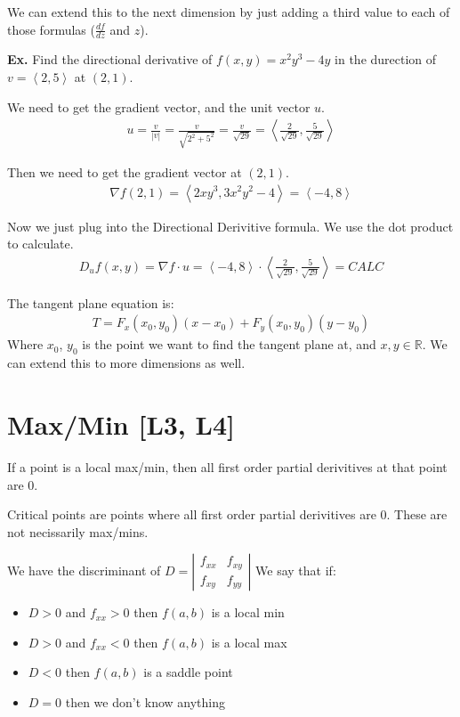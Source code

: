 \documentclass[12pt,letterpaper]{article} \usepackage{amsmath} \usepackage{graphicx} \usepackage[margin=1in]{geometry} \usepackage{longtable}  \usepackage{amssymb}
\begin{document}
	We can extend this to the next dimension by just adding a third value to each of those formulas ($\frac{df}{dz}$ and $z$).
	
	\begin{mdframed}[]
		\textbf{Ex. } Find the directional derivative of $f(x,y) = x^2y^3 - 4y$ in the durection of $v=\left<2,5\right>$ at $(2,1)$.
		
		We need to get the gradient vector, and the unit vector $u$. 
		\begin{align*}
			u = \frac{v}{|v|}=\frac{v}{\sqrt{2^2+5^2}}=\frac{v}{\sqrt{29}}=\left<\frac{2}{\sqrt{29}},\frac{5}{\sqrt{29}}\right>
		\end{align*}
	
		Then we need to get the gradient vector at $(2,1)$.
		\begin{align*}
			\nabla f(2,1)=\left<2xy^3,3x^2y^2-4\right> = \left<-4,8\right>
		\end{align*}
	
		Now we just plug into the Directional Derivitive formula. We use the dot product to calculate.
		\begin{align*}
			D_u f(x,y) = \nabla f \cdot u = \left<-4,8\right> \cdot \left<\frac{2}{\sqrt{29}},\frac{5}{\sqrt{29}}\right> = CALC
		\end{align*}
	\end{mdframed}

	The tangent plane equation is:
	\begin{align*}
		T= F_x (x_0, y_0) (x-x_0) + F_y (x_0, y_0) (y-y_0)
	\end{align*}
	Where $x_0$, $y_0$ is the point we want to find the tangent plane at, and $x, y \in \mathbb{R}$. We can extend this to more dimensions as well.
	
	\section{Max/Min [L3, L4]}
	If a point is a local max/min, then all first order partial derivitives at that point are 0. 
	
	Critical points are points where all first order partial derivitives are 0. These are not necissarily max/mins.
	
	We have the discriminant of $D = \left| 
	\begin{array}{cc}
		f_{xx} & f_{xy} \\
		f_{xy} & f_{yy}
	\end{array} \right|$
	We say that if:
	\begin{itemize}[]
		\item $D>0$ and $f_{xx} > 0$ then $f(a,b)$ is a local min
		\item $D>0$ and $f_{xx} < 0$ then $f(a,b)$ is a local max
		\item $D<0$ then $f(a,b)$ is a saddle point
		\item $D=0$ then we don't know anything
	\end{itemize}
\end{document}
